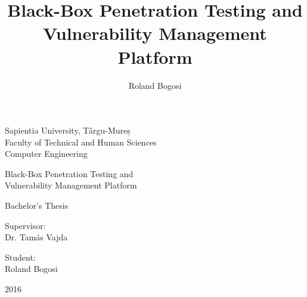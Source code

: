 \documentclass[a4paper,12pt]{article}
\author{Roland Bogosi}
\title{Black-Box Penetration Testing and Vulnerability Management Platform}
\begin{document}
%
%

\begingroup
	
\endgroup

\clearcontents

%
%

\begingroup
	
\endgroup

\clearcontents

%
%

\newpage
\pagestyle{empty}

	\begin{center}
		{\Large Sapientia University, Târgu-Mureș}\\\vspace{0.05in}
		{\Large Faculty of Technical and Human Sciences}\\\vspace{0.07in}
		{\Large Computer Engineering}\\
		
		\vspace{2.5in}
		
		{\huge Black-Box Penetration Testing and}\\\vspace{0.1in}
		{\huge Vulnerability Management Platform}
		
		\vspace{0.5in}
		
		{\LARGE Bachelor's Thesis}
		
	\end{center}
	
	\vspace{2.0in}
	
	\begin{multicols}{2}
		\begin{flushleft}
			{\Large Supervisor:}\\\vspace{0.05in}
			{\LARGE {Dr. Tamás Vajda}}
		\end{flushleft}
		\columnbreak
		\begin{flushright}
			{\Large Student:}\\\vspace{0.1in}
			{\LARGE {Roland Bogosi}}
		\end{flushright}
	\end{multicols}
	
	\vspace{1.5in}
		
	\begin{center}
		{\LARGE 2016}
	\end{center}
\end{document}
